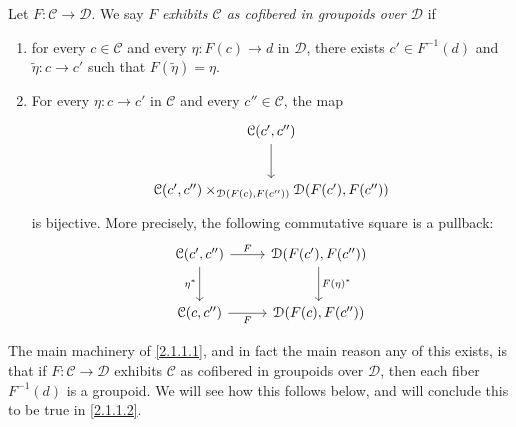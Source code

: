 \begin{definition}\label{2.1.1.1}
	Let $F : \mathcal{C}  \to \mathcal{D} $. We say $F$ \emph{exhibits $\mathcal{C} $ as cofibered in groupoids over $\mathcal{D} $} if
	\begin{enumerate}
		\item for every $c\in \mathcal{C} $ and every $\eta : F(c) \to d$ in $\mathcal{D} $, there exists $c'\in F^{-1} (d)$ and $\widetilde{\eta } : c \to c'$ such that $F(\widetilde{\eta } )=\eta $.
		\item For every $\eta : c \to c'$ in $\mathcal{C} $ and every $c''\in \mathcal{C} $, the map
			\[\begin{tikzcd}[row sep = 2.5em, column sep = 2.5em]
			\mathcal{C} (c',c'')\ar[d]  \\
			\mathcal{C} (c',c'')\times_{\mathcal{D} (F(c),F(c''))} \mathcal{D} (F(c'),F(c''))
			\end{tikzcd}\]
			is bijective. More precisely, the following commutative square is a pullback:
			\[\begin{tikzcd}[row sep = 2.5em, column sep = 2.5em]
			\mathcal{C} (c',c'')\ar[" F ", r] \ar[" \eta ^* "', d]  & \mathcal{D} (F(c'),F(c''))\ar[" F(\eta )^* ", d]  \\
			\mathcal{C} (c,c'')\ar[" F "', r]  & \mathcal{D} (F(c),F(c''))
			\end{tikzcd}\]
	\end{enumerate}
\end{definition}

The main machinery of \cref{2.1.1.1}, and in fact the main reason any of this exists, is that if $F : \mathcal{C}  \to \mathcal{D} $ exhibits $\mathcal{C} $ as cofibered in groupoids over $\mathcal{D} $, then each fiber $F^{-1} (d)$ is a groupoid. We will see how this follows below, and will conclude this to be true in \cref{2.1.1.2}.

